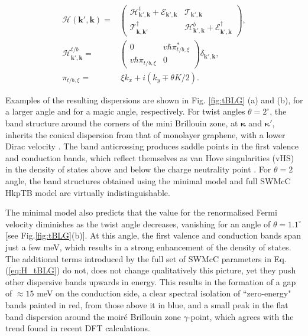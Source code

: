 \documentclass[showpacs,aps,prb,reprint,twocolumn]{revtex4-1}
\begin{document}
\begin{align}\label{eq:H_tBLG}
\mathcal{H}(\boldsymbol{k}',\boldsymbol{k})=&
\left(
\begin{matrix}
\mathcal{H}_{\boldsymbol{k}',\boldsymbol{k}}^t+
\mathcal{E}_{\boldsymbol{k}',\boldsymbol{k}}&
\mathcal{T}_{\boldsymbol{k}',\boldsymbol{k}}\\
\mathcal{T}_{\boldsymbol{k},\boldsymbol{k}'}^\dagger&
\mathcal{H}_{\boldsymbol{k}',\boldsymbol{k}}^b+
\mathcal{E}_{\boldsymbol{k}',\boldsymbol{k}}^{\dagger}
\end{matrix}
\right),\\
\mathcal{H}^{t/b}_{\boldsymbol{k}',\boldsymbol{k}}=&
\left(
\begin{matrix}
0&v\hbar\pi_{t/b,\xi}^{*}\\
v\hbar\pi_{t/b,\xi}&0
\end{matrix}
\right)
\delta_{\boldsymbol{k}',\boldsymbol{k}},\nonumber
\\
\pi_{t/b,\xi}=&\,\xi k_x+i(k_y\mp\theta K/2).
\nonumber
\end{align}

Examples of the resulting dispersions are shown in Fig. \ref{fig:tBLG} (a) and (b), for a larger angle and for a magic angle, respectively. For twist angles $\theta=2^\circ$, the band structure around the corners of the mini Brillouin zone, at $\boldsymbol{\kappa}$ and $\boldsymbol{\kappa}'$, inherits the conical dispersion from that of monolayer graphene, with a lower Dirac velocity \cite{Bistritzer_2011}. The band anticrossing produces saddle points in the first valence and conduction bands, which reflect themselves as van Hove singularities (vHS) in the density of states above and below the charge neutrality point \cite{Li_2010}. For $\theta = 2$ angle, the band structures obtained using the minimal model and full SWMcC HkpTB model are virtually indistinguishable.

The minimal model also predicts that the value for the renormalised Fermi velocity diminishes as the twist angle decreases\cite{Lopes_2007,Bistritzer_2011}, vanishing for an angle of $\theta=1.1^\circ$ [see Fig.\ref{fig:tBLG}(b)]. At this angle, the first valence and conduction bands span just a few meV, which results in a strong enhancement of the density of states. The additional terms introduced by the full set of SWMcC parameters in Eq. (\ref{eq:H_tBLG}) do not, does not change qualitatively this picture, yet they push other dispersive bands upwards in energy. This results in the formation of a gap of $\approx15$ meV on the conduction side, a clear spectral isolation of ``zero-energy" bands painted in red, from those above it in blue, and a small peak in the flat band dispersion around the moir\'{e} Brillouin zone $\gamma$-point, which agrees with the trend found in recent DFT calculations\cite{Fang_2016}. 
\end{document}
